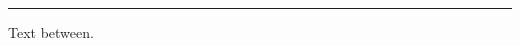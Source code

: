 \documentclass{article}
\begin{document}
\noindent\rule{2cm}{1cm}

Text between.

\begin{minipage}{\columnwidth}
\caption{Second caption.}
\end{minipage}
\end{document}
